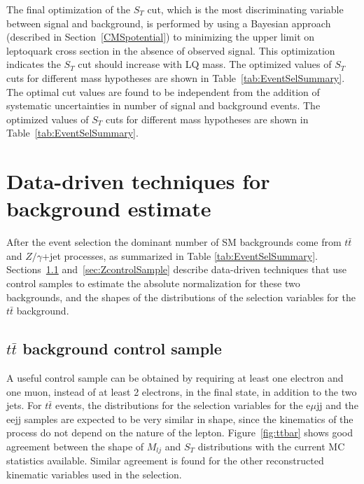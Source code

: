 \documentclass{cmspaper}
\begin{document}
\begin{linenumbers}
The final optimization of the $S_T$ cut, which is the most discriminating variable between signal and background, 
is performed by using a Bayesian approach (described in Section~\ref{CMSpotential}) to minimizing the upper limit 
on leptoquark cross section in the absence of observed signal. 
This optimization indicates the $S_T$ cut 
should increase with LQ mass. 
The optimized values of $S_{T}$ cuts for different mass hypotheses are shown in Table~\ref{tab:EventSelSummary}. 
The optimal cut values are found to be independent from the addition 
of systematic uncertainties in number of signal and background events.
The optimized values of $S_{T}$ cuts for different mass hypotheses are shown in Table~\ref{tab:EventSelSummary}. 


\section{Data-driven techniques for background estimate} \label{sec:bkgStudy}
After the event selection the dominant number of SM backgrounds 
 come from $t\bar{t}$ and $Z/\gamma$+jet processes, 
as summarized in Table \ref{tab:EventSelSummary}. 
Sections~\ref{sec:ttbarControlSample} and~\ref{sec:ZcontrolSample} 
describe data-driven techniques that use control samples 
to estimate the absolute 
normalization for these two backgrounds, and the shapes of the distributions of
the selection variables 
for the $t\bar{t}$ background. 

\subsection{$t\bar{t}$ background control sample} \label{sec:ttbarControlSample}
A useful control sample can be obtained by 
requiring at least one electron and one muon, instead of at least 2 electrons, 
in the final state, in addition to the two jets. 
For $t\bar{t}$ events, the distributions for the selection variables
for the e$\mu$jj and the eejj samples
are expected to be very similar in shape, since the kinematics 
of the process do not depend 
on the nature of the lepton. 
Figure~\ref{fig:ttbar} shows good agreement between 
the shape of $M_{lj}$ and $S_{T}$ distributions 
with the current MC statistics available. Similar agreement 
is found for the other reconstructed kinematic variables 
used in the selection. 


\end{linenumbers}
\end{document}
